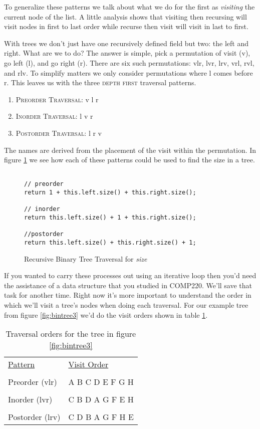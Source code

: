 \documentclass[]{tufte-handout}
\begin{document}
To generalize these patterns we talk about what we do for the first as \textit{visiting} the current node of the list. A little analysis shows that visiting then recursing will visit nodes in first to last order while recurse then visit will visit in last to first. 

With trees we don't just have one recursively defined field but two: the left and right. What are we to do? The answer is simple, pick a permutation of visit (v), go left (l), and go right (r). There are six such permutations: vlr, lvr, lrv, vrl, rvl, and rlv. To simplify matters we only consider permutations where l comes before r. This leaves us with the three \textsc{depth first} traversal patterns. 
\begin{enumerate}
\item \textsc{Preorder Traversal}:  v l r 
\item \textsc{Inorder Traversal}:  l v r
\item \textsc{Postorder Traversal}:  l r v
\end{enumerate}
The names are derived from the placement of the visit within the permutation. In figure \ref{fig:btTrav} we see how each of these patterns could be used to find the size in a tree.

\begin{figure}[!htbp]
\begin{lstlisting}

// preorder
return 1 + this.left.size() + this.right.size();

// inorder
return this.left.size() + 1 + this.right.size();

//postorder 
return this.left.size() + this.right.size() + 1;

\end{lstlisting}
\caption{ Recursive Binary Tree Traversal for \textit{size} }
\label{fig:btTrav}
\end{figure}

If you wanted to carry these processes out using an iterative loop then you'd need the assistance of a data structure that you studied in COMP220.  We'll save that task for another time. Right now it's more important to understand the order in which we'll visit a tree's nodes when doing each traversal. For our example tree from figure \ref{fig:bintree3} we'd do the visit orders shown in table \ref{tab:bt3-travs}.

\begin{table}
\begin{tabular}{ll}
\underline{Pattern} & \underline{Visit Order} \\ \\
Preorder (vlr) & A B C D E F G H \\ \\
Inorder (lvr) & C B D A G F E H \\  \\
Postorder (lrv) & C D B A G F H E 
\end{tabular}
\caption{Traversal orders for the tree in figure \ref{fig:bintree3}}
\label{tab:bt3-travs}
\end{table}
\end{document}
